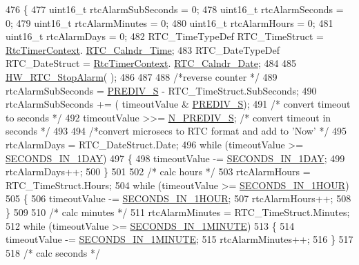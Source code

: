 \begin{DoxyCode}
476 \{
477   uint16\_t rtcAlarmSubSeconds = 0;
478   uint16\_t rtcAlarmSeconds = 0;
479   uint16\_t rtcAlarmMinutes = 0;
480   uint16\_t rtcAlarmHours = 0;
481   uint16\_t rtcAlarmDays = 0;
482   RTC\_TimeTypeDef RTC\_TimeStruct = \mbox{\hyperlink{hw__rtc_8c_a0e042f0e024135713eeb5896d77a2356}{RtcTimerContext}}.
      \mbox{\hyperlink{struct_rtc_timer_context__t_a605148ba4720b20b9ba2445a090a64d4}{RTC\_Calndr\_Time}};
483   RTC\_DateTypeDef RTC\_DateStruct = \mbox{\hyperlink{hw__rtc_8c_a0e042f0e024135713eeb5896d77a2356}{RtcTimerContext}}.
      \mbox{\hyperlink{struct_rtc_timer_context__t_a50959be607deb58750ba2eb2afaa7f46}{RTC\_Calndr\_Date}};
484 
485   \mbox{\hyperlink{group___lory_s_d_k___r_t_c___functions_ga227be06e4dc1332d46ff12519db183b5}{HW\_RTC\_StopAlarm}}( );
486 
487   
488   \textcolor{comment}{/*reverse counter */}
489   rtcAlarmSubSeconds =  \mbox{\hyperlink{hw__rtc_8c_a8647306f20268ae27f137e06f9e642fc}{PREDIV\_S}} - RTC\_TimeStruct.SubSeconds;
490   rtcAlarmSubSeconds += ( timeoutValue & \mbox{\hyperlink{hw__rtc_8c_a8647306f20268ae27f137e06f9e642fc}{PREDIV\_S}});
491   \textcolor{comment}{/* convert timeout  to seconds */}
492   timeoutValue >>= \mbox{\hyperlink{hw__rtc_8c_a5fce31e2c7437f8f58b0c67a9b2cd037}{N\_PREDIV\_S}};  \textcolor{comment}{/* convert timeout  in seconds */}
493   
494   \textcolor{comment}{/*convert microsecs to RTC format and add to 'Now' */}
495   rtcAlarmDays =  RTC\_DateStruct.Date;
496   \textcolor{keywordflow}{while} (timeoutValue >= \mbox{\hyperlink{hw__rtc_8c_acf2bd16d86f1ebf56e73b38adeafadf3}{SECONDS\_IN\_1DAY}})
497   \{
498     timeoutValue -= \mbox{\hyperlink{hw__rtc_8c_acf2bd16d86f1ebf56e73b38adeafadf3}{SECONDS\_IN\_1DAY}};
499     rtcAlarmDays++;
500   \}
501   
502   \textcolor{comment}{/* calc hours */}
503   rtcAlarmHours = RTC\_TimeStruct.Hours;
504   \textcolor{keywordflow}{while} (timeoutValue >= \mbox{\hyperlink{hw__rtc_8c_a49351bd0651fa15e2a33dd94ba993002}{SECONDS\_IN\_1HOUR}})
505   \{
506     timeoutValue -= \mbox{\hyperlink{hw__rtc_8c_a49351bd0651fa15e2a33dd94ba993002}{SECONDS\_IN\_1HOUR}};
507     rtcAlarmHours++;
508   \}
509   
510   \textcolor{comment}{/* calc minutes */}
511   rtcAlarmMinutes = RTC\_TimeStruct.Minutes;
512   \textcolor{keywordflow}{while} (timeoutValue >= \mbox{\hyperlink{hw__rtc_8c_a6bb348cf6aae2bfed39e2edd5ce0383a}{SECONDS\_IN\_1MINUTE}})
513   \{
514     timeoutValue -= \mbox{\hyperlink{hw__rtc_8c_a6bb348cf6aae2bfed39e2edd5ce0383a}{SECONDS\_IN\_1MINUTE}};
515     rtcAlarmMinutes++;
516   \}
517    
518   \textcolor{comment}{/* calc seconds */}

\end{DoxyCode}
